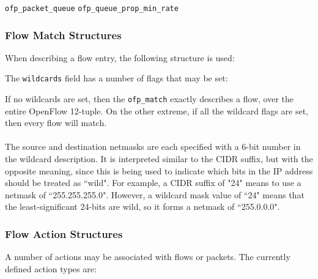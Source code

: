 \subsubsection{}
\label{cts:qos}
 \verb|ofp_packet_queue| 
\verb|ofp_queue_prop_min_rate| 

\subsubsection{Flow Match Structures}
When describing a flow entry, the following structure is used:


The \verb|wildcards| field has a number of flags that may be set:


If no wildcards are set, then the \verb|ofp_match| exactly describes a flow, over the entire OpenFlow 12-tuple.  On the other extreme, if all the wildcard flags are set, then every flow will match.
\\\\
The source and destination netmasks are each specified with a 6-bit number in the wildcard description. It is interpreted similar to the CIDR suffix, but with the opposite meaning, since this is being used to indicate which bits in the IP address should be treated as ``wild". For example, a CIDR suffix of "24" means to use a netmask of ``255.255.255.0". However, a wildcard mask value of ``24" means that the least-significant 24-bits are wild, so it forms a netmask of ``255.0.0.0". 

\subsubsection{Flow Action Structures}
A number of actions may be associated with flows or packets.  The currently defined action types are:

